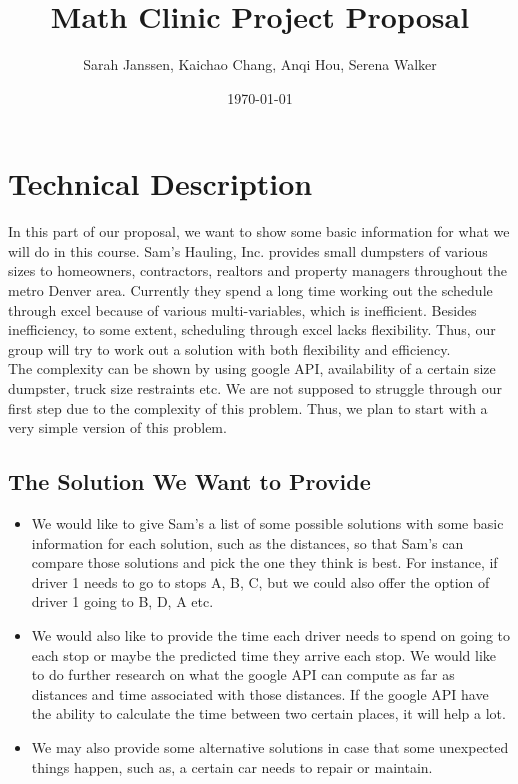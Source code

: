 \documentclass[11pt]{article}
\title{Math Clinic Project Proposal}
\author{Sarah Janssen, Kaichao Chang, Anqi Hou, Serena Walker}
\date{\today}
\begin{document}
\maketitle
\newpage

\section{Technical Description}
In this part of our proposal, we want to show some basic information for what we will do in this course. Sam's Hauling, Inc. provides small dumpsters of various sizes to homeowners, contractors, realtors and property managers throughout the metro Denver area. Currently they spend a long time working out the schedule through excel because of various multi-variables, which is inefficient. Besides inefficiency, to some extent, scheduling through excel lacks flexibility. Thus, our group will try to work out a solution with both flexibility and efficiency. \\

The complexity can be shown by using google API, availability of a certain size dumpster, truck size restraints etc. We are not supposed to struggle through our first step due to the complexity of this problem. Thus, we plan to start with a very simple version of this problem. 


\subsection{The Solution We Want to Provide}
\begin{itemize}
    \item We would like to give Sam’s a list of some possible solutions with some basic information for each solution, such as the distances, so that Sam's can compare those solutions and pick the one they think is best. For instance, if driver 1 needs to go to stops A, B, C, but we could also offer the option of driver 1 going to B, D, A etc. 
    
    \item We would also like to provide the time each driver needs to spend on going to each stop or maybe the predicted time they arrive each stop. We would like to do further research on what the google API can compute as far as distances and time associated with those distances. If the google API have the ability to calculate the time between two certain places, it will help a lot.  
    
    \item We may also provide some alternative solutions in case that some unexpected things happen, such as, a certain car needs to repair or maintain.
\end{itemize}
\end{document}
